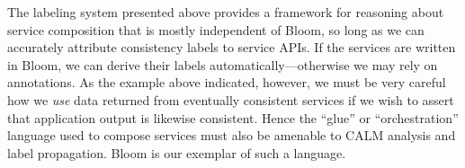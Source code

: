 
% 
% 

The labeling system presented above provides a framework for reasoning about service composition that is 
mostly independent of Bloom, so long as we can accurately attribute consistency labels to service APIs.
If the services are written in Bloom, we can derive their labels automatically---otherwise we may rely on annotations.
As the example above indicated, however, we must be very careful how we \emph{use} data returned from 
eventually consistent services
if we wish to assert that application output is likewise consistent.  Hence the ``glue'' or ``orchestration'' language used
to compose services must also be amenable to CALM analysis and label propagation.  Bloom is our exemplar of such a language.

